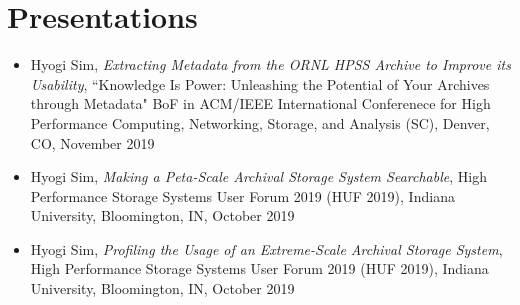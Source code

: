 \section{Presentations}

\begin{itemize}
\item {Hyogi Sim, \emph{Extracting Metadata from the ORNL HPSS Archive to
       Improve its Usability},
       ``{Knowledge Is Power: Unleashing the Potential of Your Archives
       through Metadata}" BoF in ACM/IEEE International Conferenece for
       High Performance Computing, Networking, Storage, and Analysis (SC), Denver, CO, November 2019}
\item {Hyogi Sim, \emph{Making a Peta-Scale Archival Storage System Searchable},
       High Performance Storage Systems User Forum 2019 (HUF 2019),
       Indiana University, Bloomington, IN, October 2019}
\item {Hyogi Sim, \emph{Profiling the Usage of an Extreme-Scale Archival Storage System},
       High Performance Storage Systems User Forum 2019 (HUF 2019),
       Indiana University, Bloomington, IN, October 2019}
\end{itemize}
